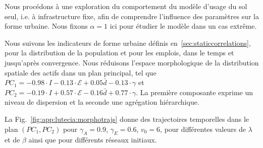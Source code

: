 Nous procédons à une exploration du comportement du modèle d'usage du sol seul, i.e. à infrastructure fixe, afin de comprendre l'influence des paramètres sur la forme urbaine. Nous fixons $\alpha = 1$ ici pour étudier le modèle dans un cas extrême.

Nous suivons les indicateurs de forme urbaine définis en~\ref{sec:staticcorrelations}, pour la distribution de la population et pour les emplois, dans le temps et jusqu'après convergence. Nous réduisons l'espace morphologique de la distribution spatiale des actifs dans un plan principal, tel que $PC_1 = -0.98 \cdot I - 0.13 \cdot \mathcal{E} + 0.05 \bar{d} - 0.13 \cdot \gamma $ et $PC_2 = -0.19 \cdot I + 0.57 \cdot \mathcal{E} - 0.16 \bar{d} + 0.77 \cdot \gamma $. La première composante exprime un niveau de dispersion et la seconde une agrégation hiérarchique.


La Fig.~\ref{fig:app:lutecia:morphotrajs} donne des trajectoires temporelles dans le plan $(PC_1,PC_2)$ pour $\gamma_A = 0.9$, $\gamma_E = 0.6$, $v_0 = 6$, pour différentes valeurs de $\lambda$ et de $\beta$ ainsi que pour différents réseaux initiaux.




